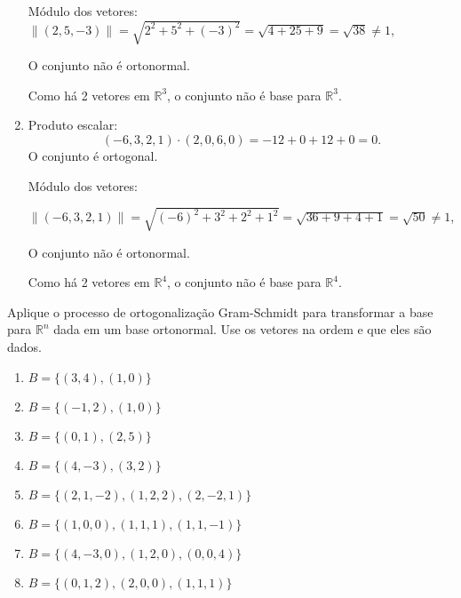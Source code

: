 \begin{resolution}
\begin{enumerate}[label=\alph*)]
          Módulo dos vetores:
          \(\|(2, 5, -3)\| = \sqrt{2^2 + 5^2 + (-3)^2} = \sqrt{4 + 25 + 9} = \sqrt{38} \neq 1\),

          O conjunto não é ortonormal.

          Como há 2 vetores em \(\mathbb{R}^3\), o conjunto não é base para \(\mathbb{R}^3\).
    \item Produto escalar:
          \[
            (-6, 3, 2, 1) \cdot (2, 0, 6, 0) = -12 + 0 + 12 + 0 = 0.
          \]
          O conjunto é ortogonal.

          Módulo dos vetores:

          \(\|(-6, 3, 2, 1)\| = \sqrt{(-6)^2 + 3^2 + 2^2 + 1^2} = \sqrt{36 + 9 + 4 + 1} = \sqrt{50} \neq 1\),

          O conjunto não é ortonormal.

          Como há 2 vetores em \(\mathbb{R}^4\), o conjunto não é base para \(\mathbb{R}^4\).
  \end{enumerate}
\end{resolution}

\begin{question}
  Aplique o processo de ortogonalização Gram-Schmidt para transformar a base para $\mathbb{R}^{n}$ dada em um base ortonormal. Use os vetores na ordem e que eles são dados.
  \vspace{-12pt}
  \begin{multicols}{2}
    \begin{enumerate}[label=\alph*)]
      \item $B = \{(3, 4), (1, 0)\}$
      \item $B = \{(-1, 2), (1, 0)\}$
      \item $B = \{(0, 1), (2, 5)\}$
      \item $B = \{(4, -3), (3, 2)\}$
      \item $B = \{(2, 1, -2), (1, 2, 2), (2, -2, 1)\}$
      \item $B = \{(1, 0, 0), (1, 1, 1), (1, 1, -1)\}$
      \item $B = \{(4, -3,0), (1, 2, 0), (0, 0, 4)\}$
      \item $B = \{(0, 1, 2), (2, 0, 0), (1, 1, 1)\}$
    \end{enumerate}
  \end{multicols}
\end{question}

